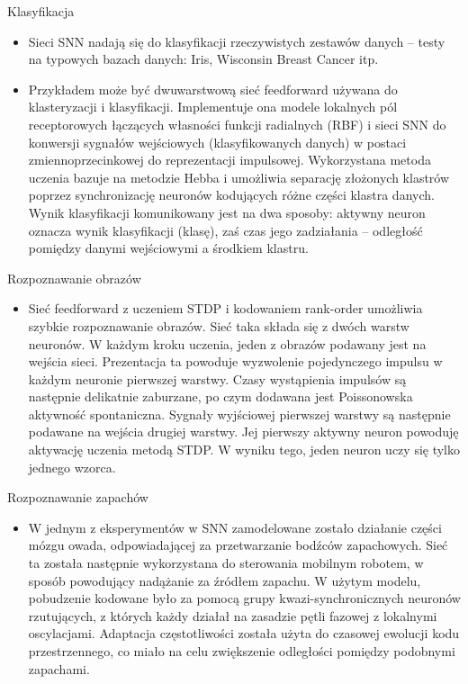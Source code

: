 \documentclass{beamer}
\begin{document}
\begin{frame}{Klasyfikacja}

\begin{itemize}
\item Sieci SNN nadają się do klasyfikacji rzeczywistych zestawów danych -- testy na typowych bazach danych: Iris, Wisconsin Breast Cancer itp.
\item Przykładem może być dwuwarstwową sieć feedforward używana do klasteryzacji i klasyfikacji. Implementuje ona modele lokalnych pól receptorowych łączących własności funkcji radialnych (RBF) i sieci SNN do konwersji sygnałów wejściowych (klasyfikowanych danych) w postaci zmiennoprzecinkowej do reprezentacji impulsowej. Wykorzystana metoda uczenia bazuje na metodzie Hebba i umożliwia separację złożonych klastrów poprzez synchronizację neuronów kodujących różne części klastra danych. Wynik klasyfikacji komunikowany jest na dwa sposoby: aktywny neuron oznacza wynik klasyfikacji (klasę), zaś czas jego zadziałania -- odległość pomiędzy danymi wejściowymi a środkiem klastru.
\end{itemize}

\end{frame}

\begin{frame}{Rozpoznawanie obrazów}

\begin{itemize}
\item Sieć feedforward z uczeniem STDP i kodowaniem rank-order umożliwia szybkie rozpoznawanie obrazów. Sieć taka składa się z dwóch warstw neuronów. W każdym kroku uczenia, jeden z obrazów podawany jest na wejścia sieci. Prezentacja ta powoduje wyzwolenie pojedynczego impulsu w każdym neuronie pierwszej warstwy. Czasy wystąpienia impulsów są następnie delikatnie zaburzane, po czym dodawana jest Poissonowska aktywność spontaniczna. Sygnały wyjściowej pierwszej warstwy są następnie podawane na wejścia drugiej warstwy. Jej pierwszy aktywny neuron powoduję aktywację uczenia metodą STDP. W wyniku tego, jeden neuron uczy się tylko jednego wzorca. 
\end{itemize}

\end{frame}

\begin{frame}{Rozpoznawanie zapachów}

\begin{itemize}

\item W jednym z eksperymentów w SNN zamodelowane zostało działanie części mózgu owada, odpowiadającej za przetwarzanie bodźców zapachowych. Sieć ta została następnie wykorzystana do sterowania mobilnym robotem, w sposób powodujący nadążanie za źródłem zapachu. W użytym modelu, pobudzenie kodowane było za pomocą grupy kwazi-synchronicznych neuronów rzutujących, z których każdy działał na zasadzie pętli fazowej z lokalnymi oscylacjami. Adaptacja częstotliwości została użyta do czasowej ewolucji kodu przestrzennego, co miało na celu zwiększenie odległości pomiędzy podobnymi zapachami.

\end{itemize}

\end{frame}
\end{document}
